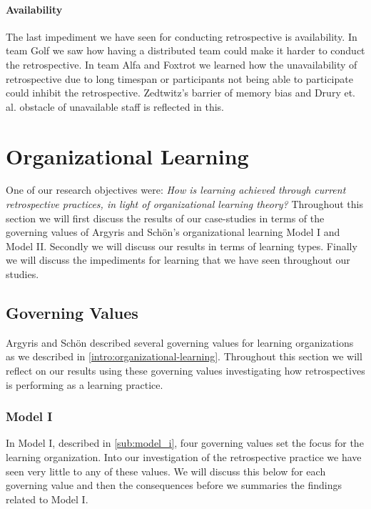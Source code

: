 \paragraph{Availability}
The last impediment we have seen for conducting retrospective is availability. In team Golf we saw how having a distributed team could make it harder to conduct the retrospective. In team Alfa and Foxtrot we learned how the unavailability of retrospective due to long timespan or participants not being able to participate could inhibit the retrospective. Zedtwitz's \cite{Zedtwitz2002} barrier of memory bias and Drury et. al. \cite{Drury2012} obstacle of unavailable staff is reflected in this. 

\clearpage

\section{Organizational Learning} %
One of our research objectives were: \textit{How is learning achieved through current retrospective practices, in light of organizational learning theory?} Throughout this section we will first discuss the results of our case-studies in terms of the governing values of Argyris and Schön's \cite{Argyris1996} organizational learning Model I and Model II. Secondly we will discuss our results in terms of learning types. Finally we will discuss the impediments for learning that we have seen throughout our studies. 

\label{sec:organizational_learning}
\subsection{Governing Values}
Argyris and Schön\cite{Argyris1996} described several governing values for learning organizations as we described in \autoref{intro:organizational-learning}. Throughout this section we will reflect on our results using these governing values investigating how retrospectives is performing as a learning practice. 

\subsubsection{Model I}
In Model I, described in \autoref{sub:model_i}, four governing values set the focus for the learning organization. Into our investigation of the retrospective practice we have seen very little to any of these values. We will discuss this below for each governing value and then the consequences before we summaries the findings related to Model I.  

